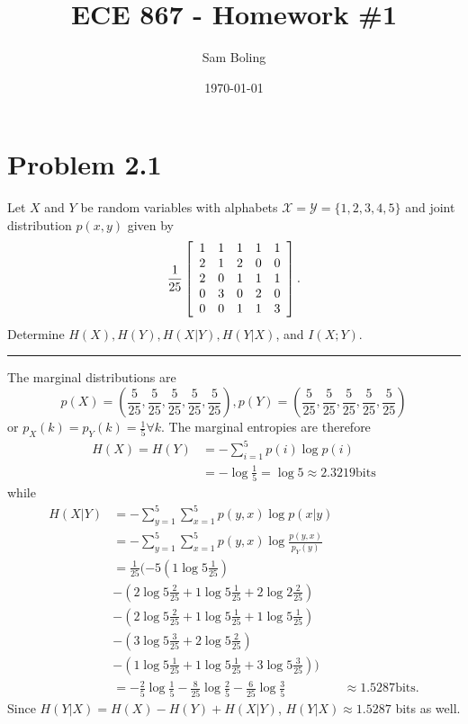\documentclass{article}
\title{ECE 867 - Homework \#1}
\author{Sam Boling}
\date{\today}
\newcommand{\horline}
           {\begin{center}
              \noindent\rule{8cm}{0.4pt}
            \end{center}}
\begin{document}
\maketitle

\section*{Problem 2.1}
Let $X$ and $Y$ be random variables with alphabets $\mathcal{X} = \mathcal{Y} = \{1,2,3,4,5\}$ and joint distribution $p(x,y)$ given by
$$
\frac{1}{25}
\left[
\begin{array}{c c c c c}
  1 & 1 & 1 & 1 & 1 \\
  2 & 1 & 2 & 0 & 0 \\
  2 & 0 & 1 & 1 & 1 \\
  0 & 3 & 0 & 2 & 0 \\
  0 & 0 & 1 & 1 & 3 
\end{array}\right].
$$
Determine $H(X), H(Y), H(X|Y), H(Y|X)$, and $I(X;Y)$.
\horline
The marginal distributions are 
$$
p(X) = \left(\frac{5}{25}, \frac{5}{25}, \frac{5}{25}, 
             \frac{5}{25}, \frac{5}{25}\right),
p(Y) = \left(\frac{5}{25}, \frac{5}{25}, \frac{5}{25},
             \frac{5}{25}, \frac{5}{25}\right)
$$
or $p_X(k) = p_Y(k) = \frac{1}{5} \forall k$.
The marginal entropies are therefore
\begin{align*}
H(X) = H(Y) & = -\sum_{i=1}^{5} p(i) \log p(i)\\ 
            & = -\log \frac{1}{5} = \log 5 \approx 2.3219 \mbox{bits}
\end{align*}
while
\begin{align*}
H(X|Y) & = -\sum_{y=1}^5 \sum_{x=1}^5 p(y, x) \log p(x|y)\\
       & = -\sum_{y=1}^5 \sum_{x=1}^5 p(y, x) \log \frac{p(y, x)}{p_Y(y)}\\
       & = \frac{1}{25}(-5(1 \log 5 \frac{1}{25}) \\
       &  -(2 \log 5 \frac{2}{25} 
           + 1 \log 5 \frac{1}{25} 
           + 2 \log 2 \frac{2}{25}) \\
       &  -(2 \log 5 \frac{2}{25} 
           + 1 \log 5 \frac{1}{25} 
           + 1 \log 5 \frac{1}{25}) \\
       &  -(3 \log 5 \frac{3}{25} 
           + 2 \log 5 \frac{2}{25}) \\
       &  -(1 \log 5 \frac{1}{25} 
           + 1 \log 5 \frac{1}{25} 
           + 3 \log 5 \frac{3}{25})) \\
       & = -\frac{2}{5} \log \frac{1}{5} 
           - \frac{8}{25} \log \frac{2}{5} - \frac{6}{25} \log \frac{3}{5}
       & \approx 1.5287 \mbox{bits}.
\end{align*}
Since $H(Y|X) = H(X) - H(Y) + H(X|Y)$, $H(Y|X) \approx 1.5287$ bits as 
well.
\end{document}
